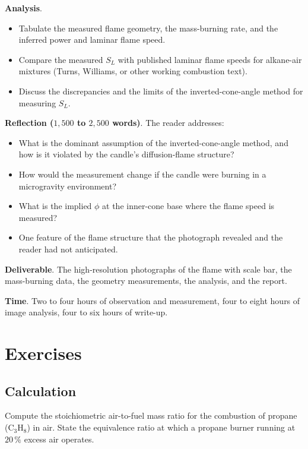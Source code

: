 \begin{project}
\textbf{Analysis}.

\begin{itemize}[leftmargin=*]
\item Tabulate the measured flame geometry, the mass-burning rate,
  and the inferred power and laminar flame speed.
\item Compare the measured $S_L$ with published laminar flame speeds
  for alkane-air mixtures (Turns, Williams, or other working
  combustion text).
\item Discuss the discrepancies and the limits of the
  inverted-cone-angle method for measuring $S_L$.
\end{itemize}

\textbf{Reflection ($1{,}500$ to $2{,}500$ words)}. The reader
addresses:

\begin{itemize}[leftmargin=*]
\item What is the dominant assumption of the inverted-cone-angle
  method, and how is it violated by the candle's diffusion-flame
  structure?
\item How would the measurement change if the candle were burning in
  a microgravity environment?
\item What is the implied $\phi$ at the inner-cone base where the
  flame speed is measured?
\item One feature of the flame structure that the photograph revealed
  and the reader had not anticipated.
\end{itemize}

\textbf{Deliverable}. The high-resolution photographs of the flame
with scale bar, the mass-burning data, the geometry measurements,
the analysis, and the report.

\textbf{Time}. Two to four hours of observation and measurement,
four to eight hours of image analysis, four to six hours of write-up.
\end{project}

\section{Exercises}

\subsection*{Calculation}

\begin{exercise}
Compute the stoichiometric air-to-fuel mass ratio for the combustion
of propane (C$_3$H$_8$) in air. State the equivalence ratio at which
a propane burner running at $20\,\%$ excess air operates.
\end{exercise}

